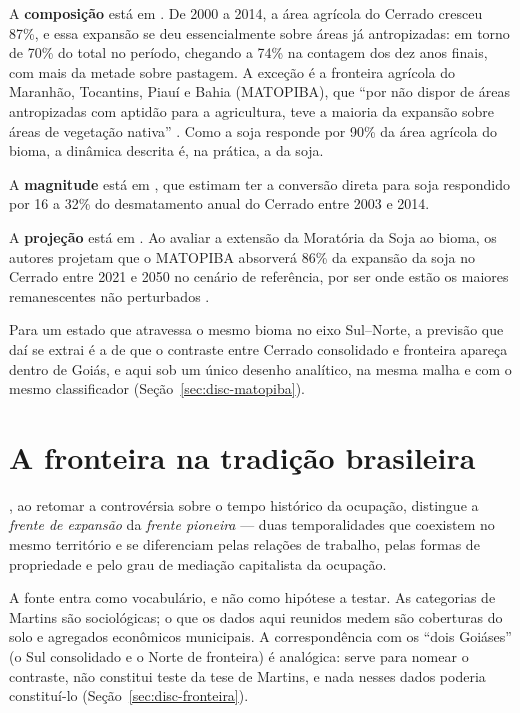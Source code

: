 A \textbf{composição} está em . De 2000 a 2014,
a área agrícola do Cerrado cresceu 87\%, e essa expansão se deu essencialmente
sobre áreas já antropizadas: em torno de 70\% do total no período, chegando a
74\% na contagem dos dez anos finais, com mais da metade sobre pastagem. A
exceção é a fronteira agrícola do Maranhão, Tocantins, Piauí e Bahia
(MATOPIBA), que ``por não dispor de áreas antropizadas com aptidão para a
agricultura, teve a maioria da expansão sobre áreas de vegetação nativa''
\cite[p.~5]{CarneiroFilho2016}. Como a soja responde por 90\% da área
agrícola do bioma, a dinâmica descrita é, na prática, a da soja.

A \textbf{magnitude} está em , que estimam ter a
conversão direta para soja respondido por 16 a 32\% do desmatamento anual do
Cerrado entre 2003 e 2014.

A \textbf{projeção} está em . Ao avaliar a extensão
da Moratória da Soja ao bioma, os autores projetam que o MATOPIBA absorverá
86\% da expansão da soja no Cerrado entre 2021 e 2050 no cenário de
referência, por ser onde estão os maiores remanescentes não perturbados
\cite[p.~2]{Soterroni2019}.

Para um estado que atravessa o mesmo bioma no eixo Sul--Norte, a previsão que
daí se extrai é a de que o contraste entre Cerrado consolidado e fronteira
apareça dentro de Goiás, e aqui sob um único desenho analítico, na mesma malha
e com o mesmo classificador (Seção~\ref{sec:disc-matopiba}).

\section{A fronteira na tradição brasileira}
\label{sec:ref-martins}

, ao retomar a controvérsia sobre o tempo histórico da
ocupação, distingue a \emph{frente de expansão} da \emph{frente pioneira} ---
duas temporalidades que coexistem no mesmo território e se diferenciam pelas
relações de trabalho, pelas formas de propriedade e pelo grau de mediação
capitalista da ocupação.

A fonte entra como vocabulário, e não como hipótese a testar. As categorias de
Martins são sociológicas; o que os dados aqui reunidos medem são coberturas do
solo e agregados econômicos municipais. A correspondência com os ``dois
Goiáses'' (o Sul consolidado e o Norte de fronteira) é analógica: serve
para nomear o contraste, não constitui teste da tese de Martins, e nada nesses
dados poderia constituí-lo (Seção~\ref{sec:disc-fronteira}).

